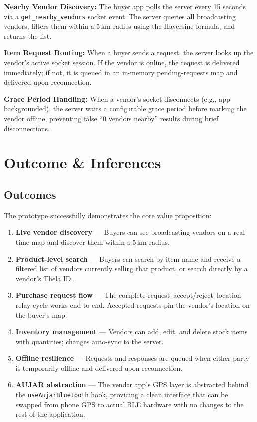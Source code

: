 \documentclass[12pt, a4paper]{article}
\begin{document}
\textbf{Nearby Vendor Discovery:} The buyer app polls the server every 15 seconds via a \texttt{get\_nearby\_vendors} socket event. The server queries all broadcasting vendors, filters them within a 5\,km radius using the Haversine formula, and returns the list.

\textbf{Item Request Routing:} When a buyer sends a request, the server looks up the vendor's active socket session. If the vendor is online, the request is delivered immediately; if not, it is queued in an in-memory pending-requests map and delivered upon reconnection.

\textbf{Grace Period Handling:} When a vendor's socket disconnects (e.g., app backgrounded), the server waits a configurable grace period before marking the vendor offline, preventing false ``0 vendors nearby'' results during brief disconnections.

\section{Outcome \& Inferences}

\subsection{Outcomes}

The prototype successfully demonstrates the core value proposition:

\begin{enumerate}[noitemsep]
    \item \textbf{Live vendor discovery} --- Buyers can see broadcasting vendors on a real-time map and discover them within a 5\,km radius.
    \item \textbf{Product-level search} --- Buyers can search by item name and receive a filtered list of vendors currently selling that product, or search directly by a vendor's Thela ID.
    \item \textbf{Purchase request flow} --- The complete request--accept/reject--location relay cycle works end-to-end. Accepted requests pin the vendor's location on the buyer's map.
    \item \textbf{Inventory management} --- Vendors can add, edit, and delete stock items with quantities; changes auto-sync to the server.
    \item \textbf{Offline resilience} --- Requests and responses are queued when either party is temporarily offline and delivered upon reconnection.
    \item \textbf{AUJAR abstraction} --- The vendor app's GPS layer is abstracted behind the \texttt{useAujarBluetooth} hook, providing a clean interface that can be swapped from phone GPS to actual BLE hardware with no changes to the rest of the application.
\end{enumerate}
\end{document}
